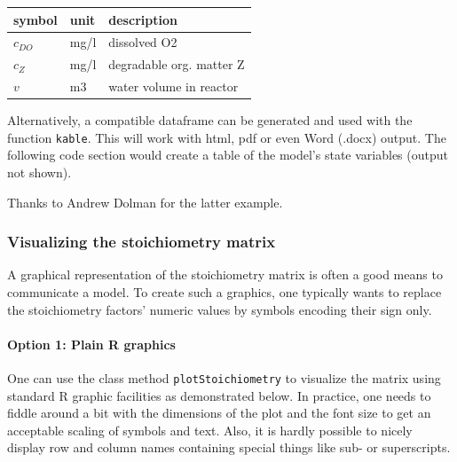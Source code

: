 \documentclass[onecolumn]{article}
\begin{document}
\bigskip
\begin{center}
  \begin{tabular}{lll}\hline
    \textbf{symbol} & \textbf{unit} & \textbf{description} \\ \hline
    $c_{DO}$ & mg/l & dissolved O2 \\
    $c_Z$ & mg/l & degradable org. matter Z \\
    $v$ & m3 & water volume in reactor \\ \hline
  \end{tabular}\end{center}

\bigskip
Alternatively, a  compatible dataframe can be generated and used with the  function \verb|kable|. This will work with html, pdf or even Word (.docx) output. The following code section would create a table of the model's state variables (output not shown).

\begin{Schunk}
\end{Schunk}


Thanks to Andrew Dolman for the latter example.

\subsubsection{Visualizing the stoichiometry matrix} \label{sec:advanced:doc:stoi}

A graphical representation of the stoichiometry matrix is often a good means to communicate a model. To create such a graphics, one typically wants to replace the stoichiometry factors' numeric values by symbols encoding their sign only.

\paragraph{Option 1: Plain R graphics}
One can use the class method \verb|plotStoichiometry| to visualize the matrix using standard R graphic facilities as demonstrated below. In practice, one needs to fiddle around a bit with the dimensions of the plot and the font size to get an acceptable scaling of symbols and text. Also, it is hardly possible to nicely display row and column names containing special things like sub- or superscripts.
\end{document}
